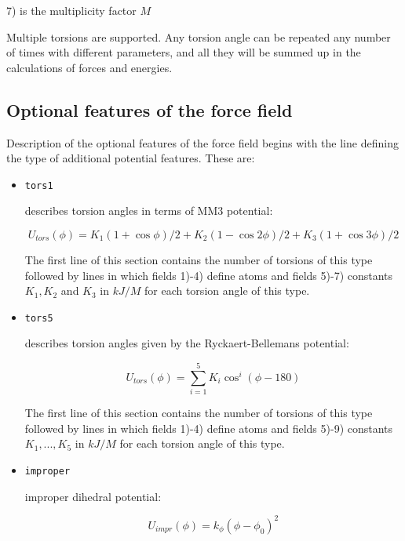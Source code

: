 \documentclass{article}
\begin{document}
7) is the multiplicity factor $M$

Multiple torsions are supported. Any torsion angle 
can be repeated any number of times with different parameters, and all
they will be summed up in the calculations of forces and energies.

\subsection{Optional features of the force field}
 
Description of the optional features of the force field begins with 
the line defining the type of additional potential features.
These are:

\begin{itemize}

\item
\verb|tors1| 

describes torsion angles in terms of MM3 potential:

\begin{equation}
\label{tors1}
U_{tors}(\phi) = K_1(1+\cos{\phi})/2 + K_2(1-\cos{2\phi})/2 + K_3(1+\cos{3\phi})/2
\end{equation}

The first line of this section contains the number of torsions of this type
followed by lines in which fields 1)-4) define atoms and fields 5)-7) 
constants $K_1,K_2$ and $K_3$ in $kJ/M$ for each torsion angle of this type.

\item
\verb|tors5| 

describes torsion angles given by the Ryckaert-Bellemans potential:

\begin{equation}
\label{tors5}
U_{tors}(\phi) = \sum_{i=1}^5 K_i\cos^i(\phi - 180)
\end{equation}

The first line of this section contains the number of torsions of this type
followed by lines in which fields 1)-4) define atoms and fields 5)-9) 
constants $K_1,...,K_5$ in $kJ/M$ for each torsion angle of this type.

\item
\verb|improper|   

improper dihedral potential:

\begin{equation}
\label{harm-ang}
U_{impr}(\phi) = k_{\phi}(\phi - \phi_0)^2
\end{equation}


\end{itemize}
\end{document}
